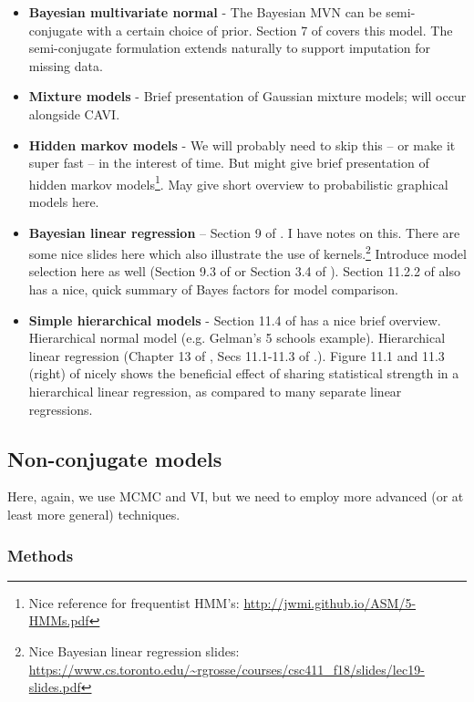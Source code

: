 \documentclass{article} %
\begin{document}
\begin{itemize}
	\item \textbf{Bayesian multivariate normal} -  The Bayesian MVN can be semi-conjugate with a certain choice of prior. Section 7 of \cite{hoff2009first} covers this model.  The semi-conjugate formulation extends naturally to support imputation for missing data.  
\item \textbf{Mixture models} - Brief presentation of Gaussian mixture models; will occur alongside CAVI.
\item \textbf{Hidden markov models} -   We will probably need to skip this -- or make it super fast -- in the interest of time.   But might give brief presentation of hidden markov models\footnote{Nice reference for frequentist HMM's: \url{http://jwmi.github.io/ASM/5-HMMs.pdf}}. May give short overview to probabilistic graphical models here.
\item \textbf{Bayesian linear regression} -- Section 9 of \cite{hoff2009first}.     I have notes on this.   There are some nice slides here which also illustrate the use of kernels.\footnote{Nice Bayesian linear regression slides: \url{https://www.cs.toronto.edu/~rgrosse/courses/csc411_f18/slides/lec19-slides.pdf}}   Introduce model selection here as well (Section 9.3 of \cite{hoff2009first} or Section 3.4 of \cite{bishop2006pattern}).   Section 11.2.2 of \cite{davison2003statistical} also has a nice,  quick summary of Bayes factors for model comparison.   
\item \textbf{Simple hierarchical models} - Section 11.4 of \cite{davison2003statistical} has a nice brief overview.    Hierarchical normal model (e.g. Gelman's 5 schools example).   Hierarchical linear regression (Chapter 13 of \cite{gelman2013bayesian},   Secs 11.1-11.3 of \cite{hoff2009first}.).  Figure 11.1 and 11.3 (right) of \cite{hoff2009first} nicely shows the beneficial effect of sharing statistical strength in a hierarchical linear regression,  as compared to many separate linear regressions.  
\end{itemize}

\subsection{Non-conjugate models} \label{sec:non_conjugacy}

Here, again, we use MCMC and VI, but we need to employ more advanced (or at least more general) techniques.

\subsubsection{Methods}
\end{document}
